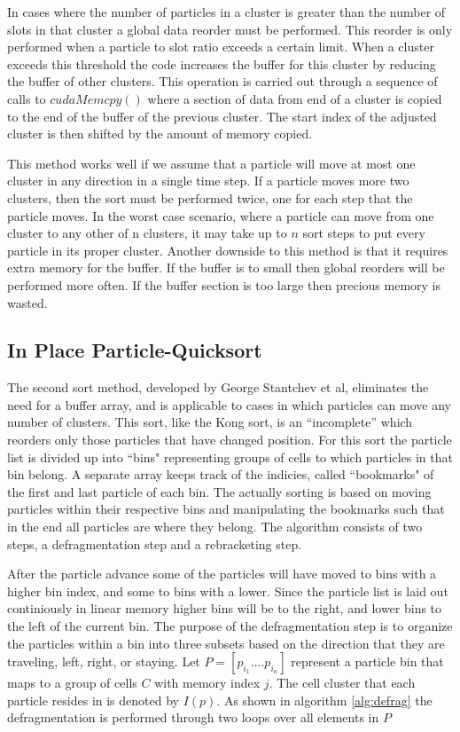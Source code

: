	In cases where the number of particles in a cluster is greater than the number of slots in that cluster a global data reorder must be performed. This reorder is only performed when a particle to slot ratio exceeds a certain limit. When a cluster exceeds this threshold the code increases the buffer for this cluster by reducing the buffer of other clusters. This operation is carried out through a sequence of calls to $cudaMemcpy()$ where a section of data from end of a cluster is copied to the end of the buffer of the previous cluster. The start index of the adjusted cluster is then shifted by the amount of memory copied. \cite{Kong2011}

	This method works well if we assume that a particle will move at most one cluster in any direction in a single time step. If a particle moves more two clusters, then the sort must be performed twice, one for each step that the particle moves. In the worst case scenario, where a particle can move from one cluster to any other of n clusters, it may take up to $n$ sort steps to put every particle in its proper cluster. Another downside to this method is that it requires extra memory for the buffer. If the buffer is to small then global reorders will be performed more often. If the buffer section is too large then precious memory is wasted. 

	\subsection{In Place Particle-Quicksort}
	The second sort method, developed by George Stantchev et al, eliminates the need for a buffer array, and is applicable to cases in which particles can move any number of clusters. This sort, like the Kong sort, is an ``incomplete'' which reorders only those particles that have changed position. For this sort the particle list is divided up into ``bins" representing groups of cells to which particles in that bin belong. A separate array keeps track of the indicies, called ``bookmarks" of the first and last particle of each bin. The actually sorting is based on moving particles within their respective bins and manipulating the bookmarks such that in the end all particles are where they belong. The algorithm consists of two steps, a defragmentation step and a rebracketing step. 
	
	After the particle advance some of the particles will have moved to bins with a higher bin index, and some to bins with a lower. Since the particle list is laid out continiously in linear memory higher bins will be to the right, and lower bins to the left of the current bin. The purpose of the defragmentation step is to organize the particles within a bin into three subsets based on the direction that they are traveling, left, right, or staying. Let $P = [p_{i_1}.... p_{i_n}]$ represent a particle bin that maps to a group of cells $C$ with memory index $j$. The cell cluster that each particle resides in is denoted by $I(p)$. As shown in algorithm \ref{alg:defrag} the defragmentation is performed through two loops over all elements in $P$

